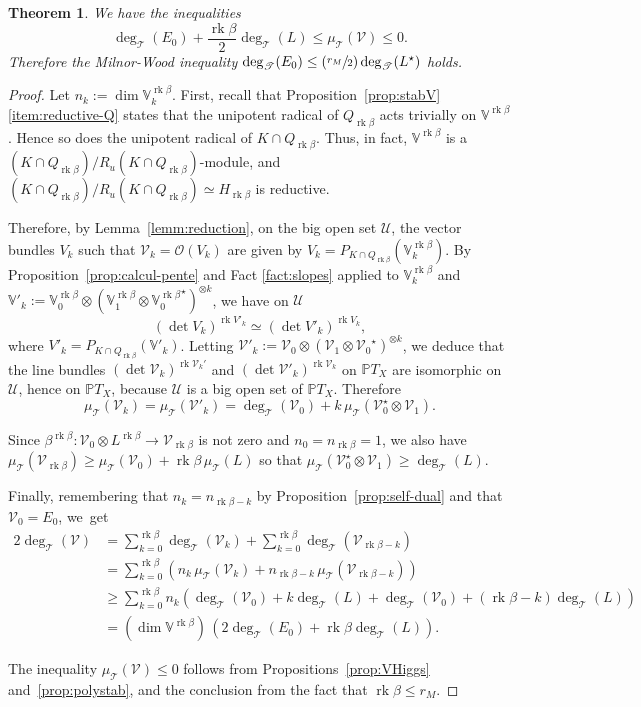 \documentclass[10pt]{amsart}
\let\mathcal\mathscr
\newcommand{\Psfrac}[2]{(\sfrac{#1}{#2})}
\theoremstyle{plain}
\newtheorem{theo}{Theorem}[section]
\theoremstyle{definition}
\DeclareMathOperator{\rk}{rk}
\newcommand{\cO}{\mathcal{O}}
\newcommand{\cT}{\mathcal{T}}
\newcommand{\cU}{\mathcal{U}}
\newcommand{\cV}{\mathcal{V}}
\newcommand{\bV}{\mathbb{V}}
\newcommand{\PTX}{{\mathbb{P}T_X}}
\newcommand{\Vb}{\mathbb{V}^{\rgb}}
\newcommand{\rkm}{{r_M}}
\newcommand{\rgb}{{\rk\beta}}
\begin{document}
\begin{theo}
\label{theo:MW} We have the inequalities
$$\deg_\cT(E_0)+\frac{\rk\beta}{2}\deg_\cT(L) \leq\mu_\cT(\cV)\leq 0.$$
Therefore the
Milnor-Wood inequality
$\deg_\cT(E_0)\leq \Psfrac \rkm{2}\deg_\cT(L^\star)$ holds.
\end{theo}

\begin{proof}
Let $n_k:=\dim \Vb_k$.
First, recall that Proposition~\ref{prop:stabV}\,\eqref{item:reductive-Q} states that the unipotent
radical of $Q_\rgb$ acts trivially on $\Vb$.
Hence so does the unipotent radical of $K \cap Q_\rgb$. Thus, in fact, $\Vb$ is a $(K \cap Q_\rgb)/R_u(K
\cap Q_\rgb)$-module, and
\hbox{$(K \cap Q_\rgb)/R_u(K \cap Q_\rgb) \simeq H_\rgb$} is reductive.

Therefore, by Lemma~\ref{lemm:reduction}, on the big open set $\cU$, the vector bundles $V_k$ such that
$\cV_k=\cO(V_k)$ are given by $V_k=P_{K\cap Q_\rgb}(\Vb_k)$.
By Proposition~\ref{prop:calcul-pente} and Fact \ref{fact:slopes} applied to
$\Vb_k$ and $\bV'_k:=\Vb_0 \otimes (\Vb_1 \otimes {\Vb_0}^\star)^{\otimes k}$, we have on $\cU$
$$
(\det V_k)^{\rk V'_k} \simeq (\det V'_k)^{\rk V_k},
$$
where $V'_k=P_{K\cap Q_\rgb}(\bV'_k)$. Letting $\cV'_k:=\cV_0 \otimes (\cV_1 \otimes
{\cV_0}^\star)^{\otimes k}$, we deduce that the line bundles $(\det \cV_k)^{\rk \cV_k'}$ and
$(\det \cV'_k)^{\rk \cV_k}$ on $\PTX$ are isomorphic on $\cU$, hence on $\PTX$, because $\cU$ is a
big open set of $\PTX$. Therefore
$$
\mu_\cT(\cV_k)=\mu_\cT(\cV'_k)=\deg_\cT(\cV_0)+k\,\mu_\cT(\cV_0^\star\otimes\cV_1).
$$

Since $\beta^\rgb:\cV_0\otimes L^\rgb\to\cV_\rgb$ is not zero and $n_0=n_\rgb=1$, we also have $\mu_\cT(\cV_\rgb)\geq \mu_\cT(\cV_0)+\rgb\,\mu_\cT(L)$ so that $\mu_\cT(\cV_0^\star\otimes\cV_1)\geq \deg_\cT (L)$.

Finally, remembering that $n_k=n_{\rgb-k}$ by Proposition~\ref{prop:self-dual} and that $\cV_0=E_0$, we~get
\begin{align*}
2\deg_\cT(\cV) & = \sum_{k=0}^\rgb \deg_\cT(\cV_k)+\sum_{k=0}^\rgb \deg_\cT(\cV_{\rgb-k}) \\
& = \sum_{k=0}^\rgb \left({ n_k\,\mu_\cT(\cV_k)+n_{\rgb-k}\, \mu_\cT(\cV_{\rgb-k})}\right) \\
& \geq \sum_{k=0}^\rgb n_k \left(\deg_\cT(\cV_0)+k\deg_\cT(L)+ \deg_\cT(\cV_0)+(\rgb-k)\deg_\cT(L)\right) \\
& = (\dim\Vb)\,(2\deg_\cT(E_0)+\rgb\deg_\cT(L)).
\end{align*}

The inequality $\mu_\cT(\cV)\leq 0$ follows from Propositions~\ref{prop:VHiggs}
and~\ref{prop:polystab},
and the
conclusion from the fact that $\rk\beta\leq \rkm$.
\end{proof}
\end{document}

